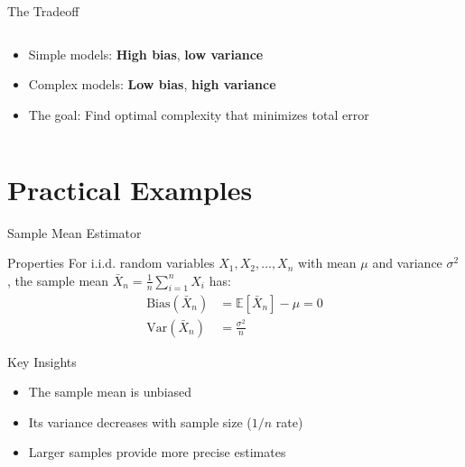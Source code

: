 \documentclass{beamer}
\begin{document}
\begin{frame}{The Tradeoff}
  \begin{columns}
    \begin{column}{0.6\textwidth}
      \begin{itemize}
        \item Simple models: \textbf{High bias}, \textbf{low variance}
        \item Complex models: \textbf{Low bias}, \textbf{high variance}
        \item The goal: Find optimal complexity that minimizes total error
      \end{itemize}
    \end{column}
    \begin{column}{0.4\textwidth}
      \center
    \end{column}
  \end{columns}
\end{frame}

\section{Practical Examples}

\begin{frame}{Sample Mean Estimator}
  \begin{block}{Properties}
    For i.i.d. random variables $X_1, X_2, \ldots, X_n$ with mean $\mu$ and variance $\sigma^2$, the sample mean $\bar{X}_n = \frac{1}{n} \sum_{i=1}^n X_i$ has:
    \begin{align*}
    \text{Bias}(\bar{X}_n) &= \mathbb{E}[\bar{X}_n] - \mu = 0 \\
    \text{Var}(\bar{X}_n) &= \frac{\sigma^2}{n}
    \end{align*}
  \end{block}
  
  \begin{block}{Key Insights}
    \begin{itemize}
      \item The sample mean is unbiased
      \item Its variance decreases with sample size ($1/n$ rate)
      \item Larger samples provide more precise estimates
    \end{itemize}
  \end{block}
\end{frame}
\end{document}

